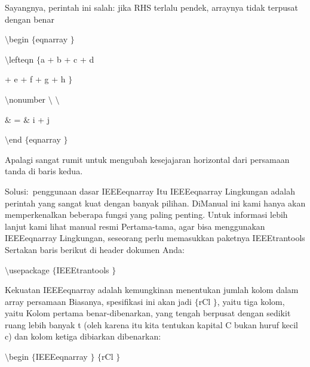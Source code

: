 \noindent 
Sayangnya, perintah ini salah: jika RHS terlalu pendek, arraynya tidak terpusat dengan benar \par
\noindent 
\vspace{16pt}
\noindent 
 $  \setminus  $begin $  \{  $eqnarray $  \}  $ \par
\vspace{12pt}
\noindent 
 $  \setminus  $lefteqn $  \{  $a + b + c + d \par
\vspace{12pt}
\noindent 
+ e + f + g + h $  \}  $ \par
\vspace{12pt}
\noindent 
 $  \setminus  $nonumber $  \setminus  $ $  \setminus  $ \par
\vspace{12pt}
\noindent 
 $  \&  $ =  $  \&  $ i + j \par
\vspace{12pt}
\noindent 
 $  \setminus  $end $  \{  $eqnarray $  \}  $ \par
\vspace{12pt}
\noindent 
Apalagi sangat rumit untuk mengubah kesejajaran horizontal dari persamaan tanda di baris kedua.  \par
\vspace{12pt}
\noindent 
Solusi:~penggunaan dasar IEEEeqnarray Itu IEEEeqnarray  Lingkungan adalah perintah yang sangat kuat dengan banyak pilihan. DiManual ini kami hanya akan memperkenalkan beberapa fungsi yang paling penting. Untuk informasi lebih lanjut kami lihat manual resmi Pertama-tama, agar bisa menggunakan IEEEeqnarray Lingkungan, seseorang perlu memasukkan paketnya IEEEtrantools Sertakan baris berikut di header dokumen Anda: \par
\vspace{12pt}
\vspace{12pt}
\noindent 
 $  \setminus  $usepackage $  \{  $IEEEtrantools $  \}  $ \par
\vspace{12pt}
\noindent 
Kekuatan IEEEeqnarray adalah kemungkinan menentukan jumlah kolom dalam array persamaan Biasanya, spesifikasi ini akan jadi  $  \{  $rCl $  \}  $, yaitu tiga kolom, yaitu Kolom pertama benar-dibenarkan, yang tengah berpusat dengan sedikit ruang lebih banyak t (oleh karena itu kita tentukan kapital C bukan huruf kecil c) dan kolom ketiga dibiarkan dibenarkan: \par
\vspace{12pt}
\noindent 
 $  \setminus  $begin $  \{  $IEEEeqnarray $  \}  $ $  \{  $rCl $  \}  $ \par
